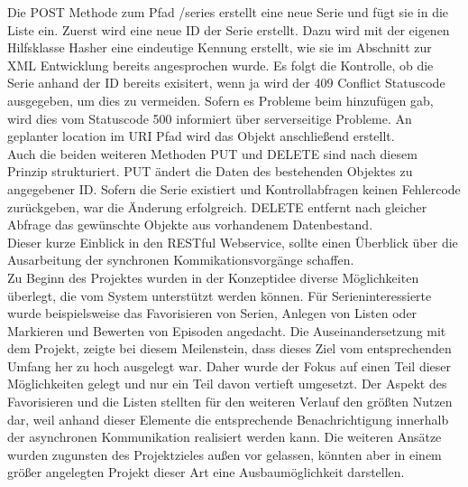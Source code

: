 Die POST Methode zum Pfad /series erstellt eine neue Serie und fügt sie in die Liste ein. Zuerst wird eine neue ID der Serie erstellt. Dazu wird mit der eigenen Hilfsklasse Hasher eine eindeutige Kennung erstellt, wie sie im Abschnitt zur XML Entwicklung bereits angesprochen wurde. Es folgt die Kontrolle, ob die Serie anhand der ID bereits exisitert, wenn ja wird der 409 Conflict Statuscode ausgegeben, um dies zu vermeiden. Sofern es Probleme beim hinzufügen gab, wird dies vom Statuscode 500 informiert über serverseitige Probleme. An geplanter location im URI Pfad wird das Objekt anschließend erstellt.\\
Auch die beiden weiteren Methoden PUT und DELETE sind nach diesem Prinzip strukturiert. PUT ändert die Daten des bestehenden Objektes zu angegebener ID. Sofern die Serie existiert und Kontrollabfragen keinen Fehlercode zurückgeben, war die Änderung erfolgreich. DELETE entfernt nach gleicher Abfrage das gewünschte Objekte aus vorhandenem Datenbestand.\\

Dieser kurze Einblick in den RESTful Webservice, sollte einen Überblick über die Ausarbeitung der synchronen Kommikationsvorgänge schaffen. \\
Zu Beginn des Projektes wurden in der Konzeptidee diverse Möglichkeiten überlegt, die vom System unterstützt werden können. Für Serieninteressierte wurde beispielsweise das Favorisieren von Serien, Anlegen von Listen oder Markieren und Bewerten von Episoden angedacht. Die Auseinandersetzung mit dem Projekt, zeigte bei diesem Meilenstein, dass dieses Ziel vom entsprechenden Umfang her zu hoch ausgelegt war. Daher wurde der Fokus auf einen Teil dieser Möglichkeiten gelegt und nur ein Teil davon vertieft umgesetzt. Der Aspekt des Favorisieren und die Listen stellten für den weiteren Verlauf den größten Nutzen dar, weil anhand dieser Elemente die entsprechende Benachrichtigung innerhalb der asynchronen Kommunikation realisiert werden kann. Die weiteren Ansätze wurden zugunsten des Projektzieles außen vor gelassen, könnten aber in einem größer angelegten Projekt dieser Art eine Ausbaumöglichkeit darstellen.




